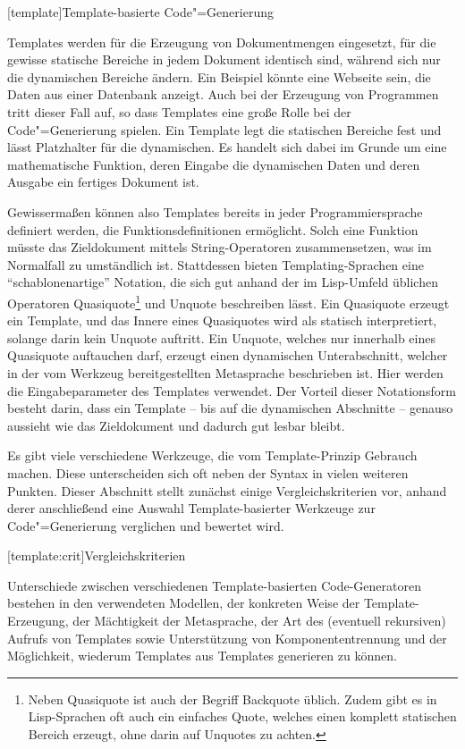 \documentclass[12pt, a4paper, bibgerm]{scrbook}
\newcommand\lchapter{}
\newcommand\lsection{}
\newcommand{\cgen}{Code"=Generierung}
\begin{document}
\lchapter[template]{Template-basierte \cgen{}}

Templates werden für die Erzeugung von Dokumentmengen eingesetzt, für
die gewisse statische Bereiche in jedem Dokument identisch sind, während
sich nur die dynamischen Bereiche ändern. Ein Beispiel könnte eine
Webseite sein, die Daten aus einer Datenbank anzeigt. Auch bei der
Erzeugung von Programmen tritt dieser Fall auf, so dass Templates eine
große Rolle bei der \cgen{} spielen. Ein Template legt die statischen
Bereiche fest und lässt Platzhalter für die dynamischen. Es handelt sich
dabei im Grunde um eine mathematische Funktion, deren Eingabe die
dynamischen Daten und deren Ausgabe ein fertiges Dokument ist.

Gewissermaßen können also Templates bereits in jeder Programmiersprache
definiert werden, die Funktionsdefinitionen ermöglicht. Solch eine
Funktion müsste das Zieldokument mittels String-Operatoren
zusammensetzen, was im Normalfall zu umständlich ist. Stattdessen bieten
Templating-Sprachen eine "`schablonenartige"' Notation, die sich gut
anhand der im Lisp-Umfeld üblichen Operatoren Quasiquote\footnote{Neben
  Quasiquote ist auch der Begriff Backquote üblich. Zudem
  gibt es in Lisp-Sprachen oft auch ein einfaches Quote, welches einen
  komplett statischen Bereich erzeugt, ohne darin auf Unquotes zu
  achten.} und Unquote beschreiben lässt. Ein Quasiquote erzeugt ein
Template, und das Innere eines Quasiquotes wird als statisch
interpretiert, solange darin kein Unquote auftritt. Ein Unquote, welches
nur innerhalb eines Quasiquote auftauchen darf, erzeugt einen
dynamischen Unterabschnitt, welcher in der vom Werkzeug bereitgestellten
Metasprache beschrieben ist. Hier werden die Eingabeparameter des
Templates verwendet. Der Vorteil dieser Notationsform besteht darin,
dass ein Template -- bis auf die dynamischen Abschnitte -- genauso
aussieht wie das Zieldokument und dadurch gut lesbar bleibt.

Es gibt viele verschiedene Werkzeuge, die vom Template-Prinzip Gebrauch
machen. Diese unterscheiden sich oft neben der Syntax in vielen weiteren
Punkten. Dieser Abschnitt stellt zunächst einige Vergleichskriterien
vor, anhand derer anschließend eine Auswahl Template-basierter Werkzeuge zur \cgen{}
verglichen und bewertet wird.

\lsection[template:crit]{Vergleichskriterien}

Unterschiede zwischen verschiedenen Template-basierten Code-Generatoren
bestehen in den verwendeten Modellen, der konkreten Weise der
Template-Erzeugung, der Mächtigkeit der Metasprache, der Art des
(eventuell rekursiven) Aufrufs von Templates sowie Unterstützung von
Komponententrennung und der Möglichkeit, wiederum Templates aus Templates
generieren zu können.
\end{document}
